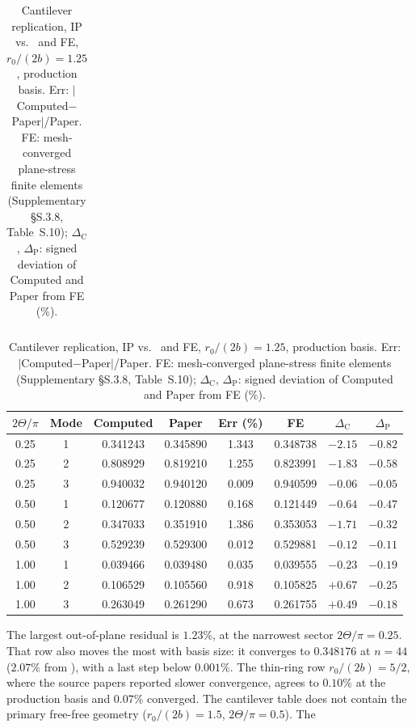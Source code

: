 \documentclass[11pt]{article}
\begin{document}
\begin{table}[!htbp]
\begin{minipage}[t]{0.43\textwidth}
\begin{tabular}{cccccc}
\end{tabular}
\end{minipage}\hfill
\begin{minipage}[t]{0.555\textwidth}
\centering\scriptsize
\setlength{\tabcolsep}{2.2pt}
\captionsetup{width=\linewidth,justification=raggedright,singlelinecheck=false}
\caption{Cantilever replication, IP vs.\ \cite{seok2} and FE, $r_0/(2b)=1.25$, production basis. Err: $|$Computed$-$Paper$|$/Paper. FE: mesh-converged plane-stress finite elements (Supplementary §S.3.8, Table~S.10); $\Delta_{\mathrm C}$, $\Delta_{\mathrm P}$: signed deviation of Computed and Paper from FE (\%).}
\label{tab:cantilever-ip}
\begin{tabular}{cccccccc}
\toprule $2\Theta/\pi$ & Mode & Computed & Paper & Err (\%) & FE & $\Delta_{\mathrm C}$ & $\Delta_{\mathrm P}$\\ \midrule
0.25 & 1 & 0.341243 & 0.345890 & 1.343 & 0.348738 & $-2.15$ & $-0.82$\\
0.25 & 2 & 0.808929 & 0.819210 & 1.255 & 0.823991 & $-1.83$ & $-0.58$\\
0.25 & 3 & 0.940032 & 0.940120 & 0.009 & 0.940599 & $-0.06$ & $-0.05$\\
0.50 & 1 & 0.120677 & 0.120880 & 0.168 & 0.121449 & $-0.64$ & $-0.47$\\
0.50 & 2 & 0.347033 & 0.351910 & 1.386 & 0.353053 & $-1.71$ & $-0.32$\\
0.50 & 3 & 0.529239 & 0.529300 & 0.012 & 0.529881 & $-0.12$ & $-0.11$\\
1.00 & 1 & 0.039466 & 0.039480 & 0.035 & 0.039555 & $-0.23$ & $-0.19$\\
1.00 & 2 & 0.106529 & 0.105560 & 0.918 & 0.105825 & $+0.67$ & $-0.25$\\
1.00 & 3 & 0.263049 & 0.261290 & 0.673 & 0.261755 & $+0.49$ & $-0.18$\\ \bottomrule

\end{tabular}
\end{minipage}
\end{table}
The largest out-of-plane residual is $1.23\%$, at the narrowest sector
$2\Theta/\pi=0.25$. That row also moves the most with basis size: it
converges to $0.348176$ at $n=44$ ($2.07\%$ from \cite{seok1}), with a
last step below $0.001\%$. The thin-ring row
$r_0/(2b)=5/2$, where the source papers reported slower convergence,
agrees to $0.10\%$ at the production basis and $0.07\%$ converged.
The cantilever table does not contain the
primary free-free geometry ($r_0/(2b)=1.5$, $2\Theta/\pi=0.5$). The
\end{document}
